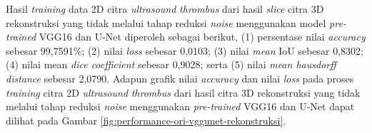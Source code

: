 \begin{enumerate}
	
	Hasil \textit{training} data 2D citra \textit{ultrasound} \textit{thrombus} dari hasil \textit{slice} citra 3D rekonstruksi yang tidak melalui tahap reduksi \textit{noise} menggunakan model \textit{pre-trained} VGG16 dan U-Net diperoleh sebagai berikut, (1) persentase nilai \textit{accuracy} sebesar 99,7591\%; (2) nilai \textit{loss} sebesar 0,0103; (3) nilai \textit{mean} IoU sebesar 0,8302; (4) nilai mean \textit{dice coefficient} sebesar 0,9028; serta (5) nilai \textit{mean hausdorff distance} sebesar 2,0790. Adapun grafik nilai \textit{accuracy} dan nilai \textit{loss} pada proses \textit{training} citra 2D \textit{ultrasound} \textit{thrombus} dari hasil citra 3D rekonstruksi yang tidak melalui tahap reduksi \textit{noise} menggunakan \textit{pre-trained} VGG16 dan U-Net dapat dilihat pada Gambar \ref{fig:performance-ori-vggunet-rekonstruksi}.
	

\end{enumerate}

